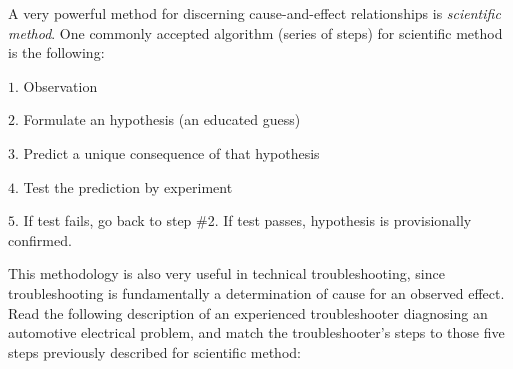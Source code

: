 

A very powerful method for discerning cause-and-effect relationships is {\it scientific method}.  One commonly accepted algorithm (series of steps) for scientific method is the following:

\medskip
\item{$1.$} Observation
\item{$2.$} Formulate an hypothesis (an educated guess)
\item{$3.$} Predict a unique consequence of that hypothesis
\item{$4.$} Test the prediction by experiment
\item{$5.$} If test fails, go back to step \#2.  If test passes, hypothesis is provisionally confirmed.
\medskip

This methodology is also very useful in technical troubleshooting, since troubleshooting is fundamentally a determination of cause for an observed effect.  Read the following description of an experienced troubleshooter diagnosing an automotive electrical problem, and match the troubleshooter's steps to those five steps previously described for scientific method:

